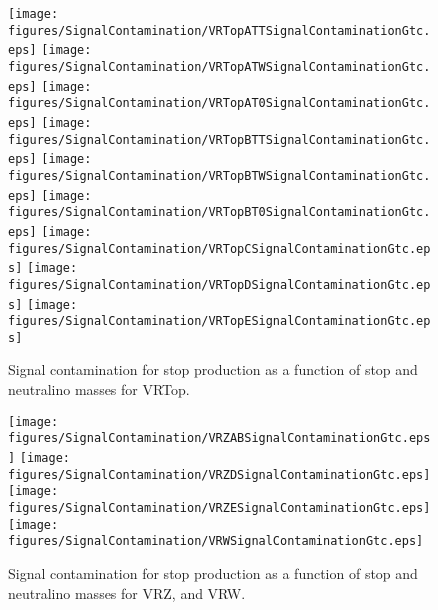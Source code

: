 \begin{figure}[htbp]
\begin{center} 
\texttt{[image: figures/SignalContamination/VRTopATTSignalContaminationGtc.eps]}
\texttt{[image: figures/SignalContamination/VRTopATWSignalContaminationGtc.eps]}
\texttt{[image: figures/SignalContamination/VRTopAT0SignalContaminationGtc.eps]}
\texttt{[image: figures/SignalContamination/VRTopBTTSignalContaminationGtc.eps]}
\texttt{[image: figures/SignalContamination/VRTopBTWSignalContaminationGtc.eps]}
\texttt{[image: figures/SignalContamination/VRTopBT0SignalContaminationGtc.eps]}
\texttt{[image: figures/SignalContamination/VRTopCSignalContaminationGtc.eps]}
\texttt{[image: figures/SignalContamination/VRTopDSignalContaminationGtc.eps]}
\texttt{[image: figures/SignalContamination/VRTopESignalContaminationGtc.eps]}
\caption{Signal contamination for stop production as a function of stop and neutralino masses for VRTop.}
\label{fig:Fit2ele}
\end{center}
\end{figure}

\begin{figure}[htbp]
\begin{center} 
\texttt{[image: figures/SignalContamination/VRZABSignalContaminationGtc.eps]}
\texttt{[image: figures/SignalContamination/VRZDSignalContaminationGtc.eps]}
\texttt{[image: figures/SignalContamination/VRZESignalContaminationGtc.eps]}
\texttt{[image: figures/SignalContamination/VRWSignalContaminationGtc.eps]}
\caption{Signal contamination for stop production as a function of stop and neutralino masses for VRZ, and VRW.}
\label{fig:Fit2ele}
\end{center}
\end{figure}
